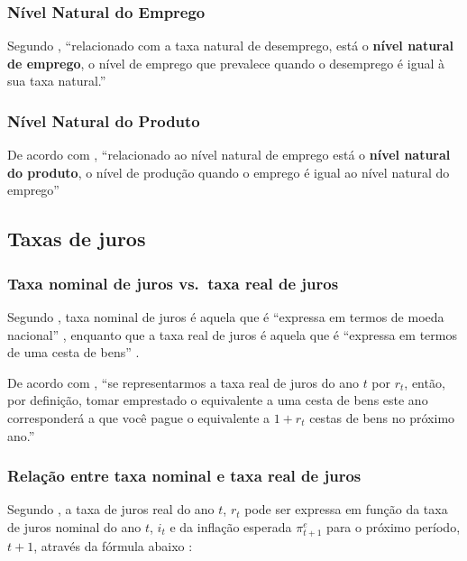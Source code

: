 \documentclass[
	10pt,				%
	openright,			%
	twoside,			%
	a5paper,			%
	english,			%
	french,				%
	spanish,			%
	brazil				%
	]{abntex2}
\begin{document}
\subsubsection{Nível Natural do
Emprego}\label{nuxedvel-natural-do-emprego}

Segundo , ``relacionado com a taxa natural
de desemprego, está o \textbf{nível natural de emprego}, o nível de
emprego que prevalece quando o desemprego é igual à sua taxa natural.''

\subsubsection{Nível Natural do
Produto}\label{nuxedvel-natural-do-produto}

De acordo com , ``relacionado ao nível
natural de emprego está o \textbf{nível natural do produto}, o nível de
produção quando o emprego é igual ao nível natural do emprego''

\subsection{Taxas de juros}\label{taxas-de-juros}

\subsubsection{Taxa nominal de juros vs.~taxa real de
juros}\label{taxa-nominal-de-juros-vs.taxa-real-de-juros}

Segundo , taxa nominal de juros é aquela que
é ``expressa em termos de moeda nacional'' \cite[p.~274]{blanchard},
enquanto que a taxa real de juros é aquela que é ``expressa em termos de
uma cesta de bens'' \cite[p.~274]{blanchard}.

De acordo com , ``se representarmos a taxa
real de juros do ano \(t\) por \(r_t\), então, por definição, tomar
emprestado o equivalente a uma cesta de bens este ano corresponderá a
que você pague o equivalente a \(1 + r_t\) cestas de bens no próximo
ano.''

\subsubsection{Relação entre taxa nominal e taxa real de
juros}\label{relauxe7uxe3o-entre-taxa-nominal-e-taxa-real-de-juros}

Segundo , a taxa de juros real do ano \(t\),
\(r_t\) pode ser expressa em função da taxa de juros nominal do ano
\(t\), \(i_t\) e da inflação esperada \(\pi_{t+1}^e\) para o próximo
período, \(t+1\), através da fórmula abaixo \cite[p.~276]{blanchard}:
\end{document}

